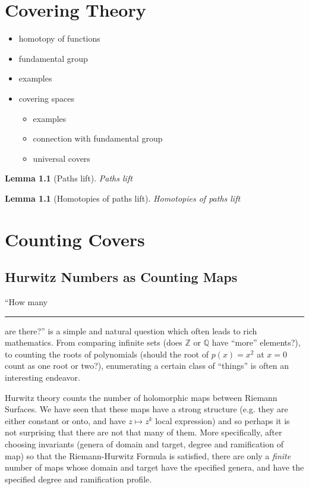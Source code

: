 \documentclass[12pt]{book}%
\theoremstyle{plain}
\newtheorem{lemma}[theorem]{Lemma}
\theoremstyle{definition}
\theoremstyle{remark}
\def\bQ{{\mathbb{Q}}}
\def\bZ{{\mathbb{Z}}}
\begin{document}
\chapter{Covering Theory}
\label{coveringTheory}

\begin{itemize}
\item homotopy of functions
\item fundamental group
\item examples
\item covering spaces
\begin{itemize}
\item examples
\item connection with fundamental group
\item universal covers
\end{itemize}
\end{itemize}


\begin{lemma}[Paths lift]
\label{pathsLiftLemma}
Paths lift
\end{lemma}

\begin{lemma}[Homotopies of paths lift]
\label{homotopiesPathsLiftLemma}
Homotopies of paths lift
\end{lemma}




\chapter{Counting Covers}
\label{countingCovers}


\section{Hurwitz Numbers as Counting Maps}

``How many \rule{.7in}{0.4pt} are there?'' is a simple and natural question which often leads to rich mathematics. From comparing infinite sets (does $\bZ$ or $\bQ$ have ``more'' elements?), to counting the roots of polynomials (should the root of $p(x)=x^2$ at $x=0$ count as one root or two?), enumerating a certain class of ``things'' is often an interesting endeavor.

Hurwitz theory counts the number of holomorphic maps between Riemann Surfaces. We have seen that these maps have a strong structure (e.g. they are either constant or onto, and have $z\mapsto z^k$ local expression) and so perhaps it is not surprising that there are not that many of them. More specifically, after choosing invariants (genera of domain and target, degree and ramification of map) so that the Riemann-Hurwitz Formula is satisfied, there are only a \textit{finite} number of maps whose domain and target have the specified genera, and have the specified degree and ramification profile.
\end{document}
